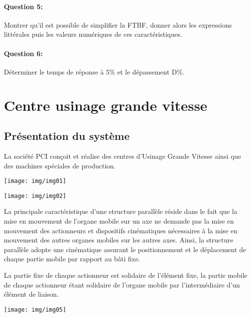 \paragraph{Question 5:} Montrer qu'il est possible de simplifier la FTBF, donner alors les expressions littérales puis les valeurs numériques de ces caractéristiques.

\paragraph{Question 6:} Déterminer le temps de réponse à 5\% et le dépassement D\%.

\section{Centre usinage grande vitesse}

\subsection{Présentation du système}

La société PCI conçoit et réalise des centres d'Usinage Grande Vitesse ainsi que des machines spéciales de production.

\begin{minipage}{0.48\linewidth}
 \centering \texttt{[image: img/img01]}
\end{minipage}\hfill
\begin{minipage}{0.48\linewidth}
 \centering \texttt{[image: img/img02]}
\end{minipage}

La principale caractéristique d'une structure parallèle réside dans le fait que la mise en mouvement de l'organe mobile sur un axe ne demande pas la mise en mouvement des actionneurs et dispositifs cinématiques nécessaires à la mise en mouvement des autres organes mobiles sur les autres axes. Ainsi, la structure parallèle adopte une cinématique assurant le positionnement et le déplacement de chaque partie mobile par rapport au bâti fixe.

La partie fixe de chaque actionneur est solidaire de l'élément fixe, la partie mobile de chaque actionneur étant solidaire de l'organe mobile par l'intermédiaire d'un élément de liaison.

\begin{center}
 \texttt{[image: img/img05]}
\end{center}

